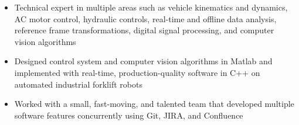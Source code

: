 	\begin{itemize} [leftmargin = \itemmargin]
		\item Technical expert in multiple areas such as vehicle kinematics and dynamics, AC motor control, hydraulic controls, real-time and offline data analysis, reference frame transformations, digital signal processing, and computer vision algorithms
			
		\item Designed control system and computer vision algorithms in Matlab and implemented with real-time, production-quality software in C++ on automated industrial forklift robots
		
		\item Worked with a small, fast-moving, and talented team that developed multiple software features concurrently using Git, JIRA, and Confluence
		
	\end{itemize} \\